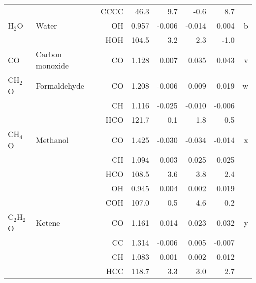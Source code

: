 \begin{table}
\begin{center}
\begin{tabular}{llrrrrrr}
             &                                    &CCCC        &      46.3   &       9.7 &      -0.6 &       8.7   &       \\
 H$_2$O         & Water                              &OH            &     0.957   &    -0.006 &    -0.014 &     0.004 &     b \\
             &                                    &HOH         &     104.5   &       3.2 &       2.3 &      -1.0   &       \\
 CO          & Carbon monoxide                    &CO            &     1.128   &     0.007 &     0.035 &     0.043 &     v \\
 CH$_2$O        & Formaldehyde                       &CO            &     1.208   &    -0.006 &     0.009 &     0.019 &     w \\
             &                                    &CH            &     1.116   &    -0.025 &    -0.010 &    -0.006 &       \\
             &                                    &HCO         &     121.7   &       0.1 &       1.8 &       0.5   &       \\
 CH$_4$O        & Methanol                           &CO            &     1.425   &    -0.030 &    -0.034 &    -0.014 &     x \\
             &                                    &CH            &     1.094   &     0.003 &     0.025 &     0.025 &       \\
             &                                    &HCO         &     108.5   &       3.6 &       3.8 &       2.4   &       \\
             &                                    &OH            &     0.945   &     0.004 &     0.002 &     0.019 &       \\
             &                                    &COH         &     107.0   &       0.5 &       4.6 &       0.2   &       \\
 C$_2$H$_2$O       & Ketene                             &CO            &     1.161   &     0.014 &     0.023 &     0.032 &     y \\
             &                                    &CC            &     1.314   &    -0.006 &     0.005 &    -0.007 &       \\
             &                                    &CH            &     1.083   &     0.001 &     0.002 &     0.012 &       \\
             &                                    &HCC         &     118.7   &       3.3 &       3.0 &       2.7   &       \\

\end{tabular}
\end{center}
\end{table}
